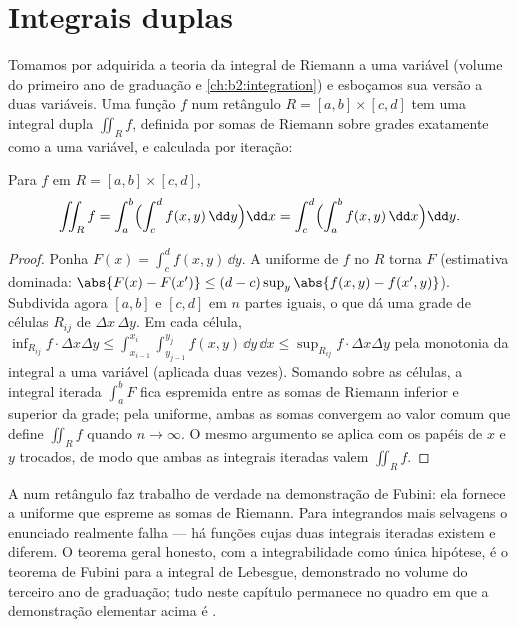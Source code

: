 \section{Integrais duplas}

Tomamos por adquirida a teoria da integral de Riemann a uma
variável (volume do primeiro ano de graduação e \cref{ch:b2:integration}) e esboçamos
sua versão a duas variáveis. Uma função $f$  num retângulo
$R = [a, b] \times [c, d]$ tem uma integral dupla $\iint_R f$,
definida por somas de Riemann sobre grades exatamente como a uma variável, e
calculada por iteração:

\begin{theorem}\label{thm:b2:multint:fubini}
Para $f$  em $R = [a,b] \times [c,d]$,
\[
\iint_R f
= \int_a^b \Bigl(\int_c^d f(x, y)\,\dd y\Bigr)\dd x
= \int_c^d \Bigl(\int_a^b f(x, y)\,\dd x\Bigr)\dd y .
\]
\end{theorem}

\begin{proof}
Ponha $F(x) = \int_c^d f(x, y)\,\dd y$. A  uniforme de $f$ no
 $R$ torna $F$  (estimativa dominada:
$\abs{F(x) - F(x')} \leq (d - c)\sup_y\abs{f(x,y) - f(x',y)}$).
Subdivida agora $[a,b]$ e $[c,d]$ em $n$ partes iguais, o que dá uma
grade de células $R_{ij}$ de  $\Delta x\,\Delta y$. Em cada célula,
$\inf_{R_{ij}} f \cdot \Delta x \Delta y \leq
\int_{x_{i-1}}^{x_i}\int_{y_{j-1}}^{y_j} f(x,y)\,\dd y\,\dd x \leq
\sup_{R_{ij}} f \cdot \Delta x \Delta y$ pela monotonia da
integral a uma variável (aplicada duas vezes). Somando sobre as células, a
integral iterada $\int_a^b F$ fica espremida entre as somas de Riemann
inferior e superior da grade; pela  uniforme, ambas as somas
convergem ao valor comum que define $\iint_R f$ quando $n \to
\infty$. O mesmo argumento se aplica com os papéis de $x$ e $y$
trocados, de modo que ambas as integrais iteradas valem $\iint_R f$.
\end{proof}

\begin{remark}
A  num retângulo  faz trabalho de verdade na
demonstração de Fubini: ela fornece a  uniforme que
espreme as somas de Riemann. Para integrandos mais selvagens o
enunciado realmente falha --- há funções cujas duas
integrais iteradas existem e diferem. O teorema geral honesto,
com a integrabilidade como única hipótese, é o
teorema de Fubini para a integral de Lebesgue, demonstrado no
volume do terceiro ano de graduação; tudo neste capítulo permanece no
quadro  em que a demonstração elementar acima é
.
\end{remark}

